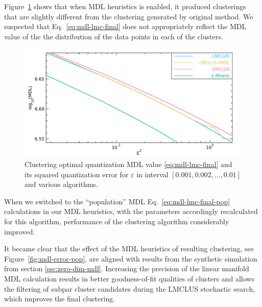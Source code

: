 Figure~\ref{fig:mdl-error} shows that when MDL heuristics is enabled, it
produced clusterings that are slightly different from the clustering generated
by original method. We suspected that Eq.~\eqref{eq:mdl-lmc-final} does not
appropriately reflect the MDL value of the the distribution of the data points
in each of the clusters.

\begin{figure}[ht]
\centering
\includegraphics[scale=0.3]{img/toterrs2-mdl-oq.pdf}
\caption{Clustering optimal quantization MDL value \eqref{eq:mdl-lmc-final} and its squared quantization error for $\varepsilon$ in interval $\left[0.001, 0.002, \dots, 0.01 \right]$ and various algorithms.}
\label{fig:mdl-error}
\end{figure}

When we switched to the ``population'' MDL Eq.~\eqref{eq:mdl-lmc-final-pop}
calculations in our MDL heuristics, with the parameters accordingly recalculated
for this algorithm, performance of the clustering algorithm considerably improved.

It became clear that the effect of the MDL heuristics of resulting clustering,
see Figure~\ref{fig:mdl-error-pop}, are aligned with results from the synthetic
simulation from section \ref{ssc:zero-dim-mdl}. Increasing the precision of
the linear manifold MDL calculation results in better goodness-of-fit qualities
of clusters and allows the filtering of subpar cluster candidates during
the LMCLUS stochastic search, which improves the final clustering.

